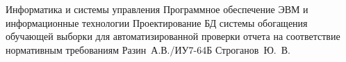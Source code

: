 \documentclass{bmstu}[a4paper]
\begin{document}
	\makecourseworktitle	
	{Информатика и системы управления} %
	{Программное обеспечение ЭВМ и информационные технологии} %
	{Проектирование БД системы обогащения обучающей выборки для автоматизированной проверки отчета на соответствие нормативным требованиям} %
	{Разин~А.В./ИУ7-64Б} %
	{Строганов~Ю.~В.} %
	{} %
	
	\setcounter{page}{3}
	
	\maketableofcontents

	
	
	
	
	
	


	\makebibliography

	
\end{document}
